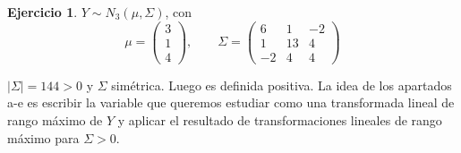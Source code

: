 \documentclass[12pt,spanish]{article}
\theoremstyle{definition}
\newtheorem{exercise}{Ejercicio}
\begin{document}
\setcounter{exercise}{6}
\begin{exercise}
  $Y\sim N_3(\mu,\Sigma)$, con
  \[\mu=
    \begin{pmatrix}
      3 \\
      1 \\
      4
    \end{pmatrix},\qquad \Sigma=
    \begin{pmatrix}
      6 & 1 & -2 \\
      1 & 13 & 4 \\
      -2 & 4 & 4
    \end{pmatrix}
  \]

  $|\Sigma|=144>0$ y $\Sigma$ simétrica. Luego es definida
  positiva. La idea de los apartados a-e es escribir la variable que
  queremos estudiar como una transformada lineal de rango máximo de
  $Y$ y aplicar el resultado de transformaciones lineales de rango
  máximo para $\Sigma>0$.
  

\end{exercise}
\end{document}
